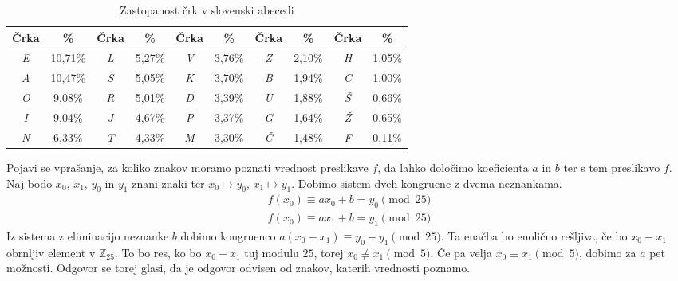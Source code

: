 \documentclass[12pt, a4paper]{article}
\begin{document}
\begin{table}[!ht]
\centering
\caption{Zastopanost črk v slovenski abecedi}
\label{zastopanost}
\begin{tabular}{|c|c|c|c|c|c|c|c|c|c|}
\hline
\textbf{Črka} & \textbf{\%} & \textbf{Črka} & \textbf{\%} & \textbf{Črka} & \textbf{\%} & \textbf{Črka} & \textbf{\%} & \textbf{Črka} & \textbf{\%} \\ \hline
\textit{E}    & 10,71\%            & \textit{L}    & 5,27\%             & \textit{V}    & 3,76\%             & \textit{Z}    & 2,10\%             & \textit{H}    & 1,05\%             \\ \hline
\textit{A}    & 10,47\%            & \textit{S}    & 5,05\%             & \textit{K}    & 3,70\%             & \textit{B}    & 1,94\%             & \textit{C}    & 1,00\%             \\ \hline
\textit{O}    & 9,08\%             & \textit{R}    & 5,01\%             & \textit{D}    & 3,39\%             & \textit{U}    & 1,88\%             & \textit{Š}    & 0,66\%             \\ \hline
\textit{I}    & 9,04\%             & \textit{J}    & 4,67\%             & \textit{P}    & 3,37\%             & \textit{G}    & 1,64\%             & \textit{Ž}    & 0,65\%             \\ \hline
\textit{N}    & 6,33\%             & \textit{T}    & 4,33\%             & \textit{M}    & 3,30\%             & \textit{Č}    & 1,48\%             & \textit{F}    & 0,11\%             \\ \hline
\end{tabular}
\end{table}

Pojavi se vprašanje, za koliko znakov moramo poznati vrednost preslikave $f$, da lahko določimo koeficienta $a$ in $b$ ter s tem preslikavo $f$. Naj bodo $x_0$, $x_1$, $y_0$ in $y_1$ znani znaki ter $x_0\mapsto y_0$, $x_1\mapsto y_1$. Dobimo sistem dveh kongruenc z dvema neznankama.
\begin{align*}
f(x_0)\equiv ax_0 + b = y_0 \pmod{25} \\
f(x_0)\equiv ax_1 + b = y_1 \pmod{25}
\end{align*}
Iz sistema z eliminacijo neznanke $b$ dobimo kongruenco $a(x_0-x_1)\equiv y_0-y_1\pmod{25}$. Ta enačba bo enolično rešljiva, če bo $x_0-x_1$ obrnljiv element v $\mathbb{Z}_{25}$. To bo res, ko bo $x_0-x_1$ tuj modulu $25$, torej $x_0\not\equiv x_1 \pmod5$. Če pa velja $x_0\equiv x_1 \pmod5$, dobimo za $a$ pet možnosti. Odgovor se torej glasi, da je odgovor odvisen od znakov, katerih vrednosti poznamo.
\end{document}
